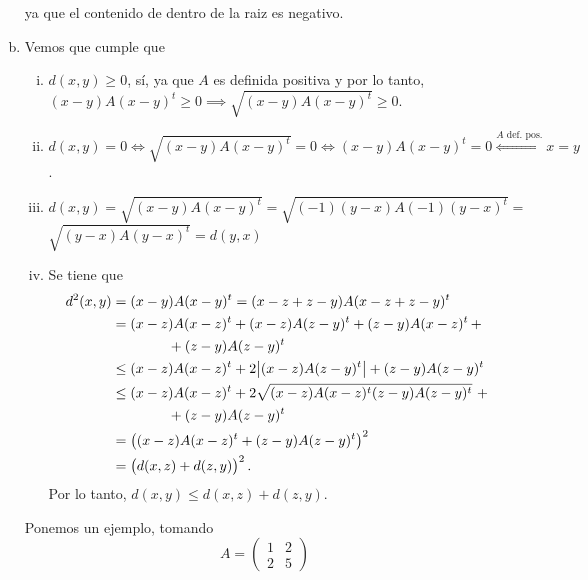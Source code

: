 \begin{eje}
\begin{enumerate}[(a)]
            ya que el contenido de dentro de la raiz es negativo.
        \item Vemos que cumple que
            \begin{enumerate}[i)]
                \item $d(x, y) \geq 0$, sí, ya que $A$ es definida positiva y por lo tanto, $(x-y)A(x-y)^t \geq 0 \implies \sqrt{(x-y)A(x-y)^t} \geq 0$.
                \item $d(x, y) = 0 \iff \sqrt{(x-y)A(x-y)^t} = 0 \iff (x-y)A(x-y)^t = 0 \stackrel{A \text{ def. pos.}}{\iff} x = y$.
                \item $d(x, y) = \sqrt{(x-y)A(x-y)^t} = \sqrt{(-1)(y-x)A(-1)(y-x)^t} =$ \\ $\sqrt{(y-x)A(y-x)^t} = d(y, x)$
                \item Se tiene que
                    \begin{align*}
                        d^2(x,y) &= (x-y)A(x-y)^t = (x-z+z-y)A(x-z+z-y)^t \\
                        &= (x-z)A(x-z)^t + (x-z)A(z-y)^t + (z-y)A(x-z)^t\, + \\
                        &\qquad\qquad + (z-y)A(z-y)^t \\
                        &\leq (x-z)A(x-z)^t + 2 \abs{(x-z)A(z-y)^t} + (z-y)A(z-y)^t \\
                        &\leq (x-z)A(x-z)^t + 2 \sqrt{(x-z)A(x-z)^t(z-y)A(z-y)^t} \,\,+ \\
                        &\qquad\qquad + (z-y)A(z-y)^t \\
                        &= \left( (x-z)A(x-z)^t + (z-y)A(z-y)^t \right)^2 \\
                        &= \left( d(x,z) + d(z,y) \right)^2.
                    \end{align*}
                    Por lo tanto, $d(x,y) \leq d(x,z) + d(z,y)$.
            \end{enumerate}
            Ponemos un ejemplo, tomando
            \[
                A =
                \begin{pmatrix}
                    1 & 2 \\
                    2 & 5
                \end{pmatrix}
            \]
            \begin{center}
                
            \end{center}
    \end{enumerate}
\end{eje}

